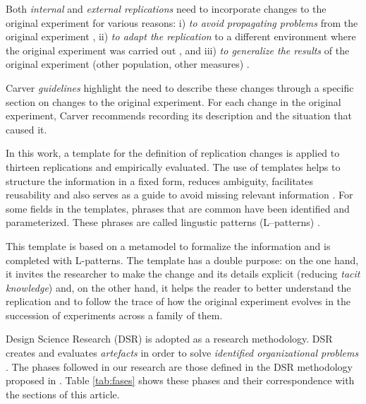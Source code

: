 Both \emph{internal} and \emph{external replications} need to incorporate changes to the original experiment for various reasons: i) \emph{to avoid propagating problems} from the original experiment \cite{kitchenham2008role}, ii) \emph{to adapt the replication} to a different environment where the original experiment was carried out \cite{Baldassarre}, and iii) \emph{to generalize the results} of the original experiment (other population, other measures) \cite{shull2008role}.  

Carver \emph{guidelines} \cite{carver2010towards} highlight the need to describe these changes through a \textcolor[rgb]{1,0,0}{specific section} on changes to the original experiment. For each change in the original experiment, Carver recommends recording its description and the situation that caused it. %

In this work, a template for the definition of replication changes is applied to thirteen replications and empirically evaluated. %
The use of templates helps to structure the information in a fixed form, reduces ambiguity, facilitates reusability and also serves as a guide to avoid missing relevant information \cite{duran1999requirements}. For some fields in the templates, phrases that are common have been identified and parameterized. These phrases are called lingustic patterns (L–patterns) \cite{toro2000metodologia}.

This template is based on a metamodel to formalize the information and is completed with L-patterns.
The template has a double purpose: on the one hand, it invites the researcher to make the change and its details explicit (reducing \emph{tacit knowledge}) and, on the other hand, it helps the reader to better understand the replication and to follow the trace of how the original experiment evolves in the succession of experiments across a family of them.

Design Science Research (DSR) is adopted as a research methodology. DSR creates and evaluates \emph{artefacts} in order to solve \emph{identified organizational problems} \cite{von2004design}. The phases followed in our research are those defined in the DSR methodology proposed in \cite{Vaishnavi}. Table \ref{tab:fases} shows these phases and their correspondence with the sections of this article.
%


